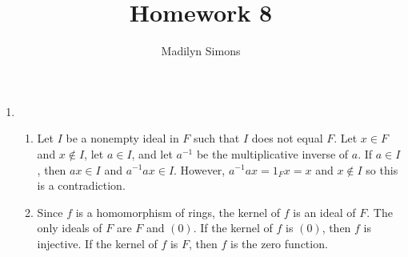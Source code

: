 \documentclass{article}
\title{Homework 8}
\author{Madilyn Simons}
\date{}
\begin{document}
\maketitle

\begin{enumerate}

\item
\begin{enumerate}

\item Let $I$ be a nonempty ideal in $F$ such that $I$ does not equal $F$.
Let $x \in F$ and $x \notin I$, let $a \in I$, and let $a^{-1}$ be the
multiplicative inverse of $a$.  If $a \in I$, then $ax \in I$ and
$a^{-1}ax \in I$.  However, $a^{-1}ax = 1_{F}x = x$ and $x \notin I$ so this
is a contradiction.

\item Since $f$ is a homomorphism of rings, the kernel of $f$ is an ideal
of $F$.  The only ideals of $F$ are $F$ and $(0)$.  If the kernel of
$f$ is $(0)$, then $f$ is injective.  If the kernel of $f$ is $F$, then
$f$ is the zero function.

\end{enumerate}


\end{enumerate}
\end{document}
